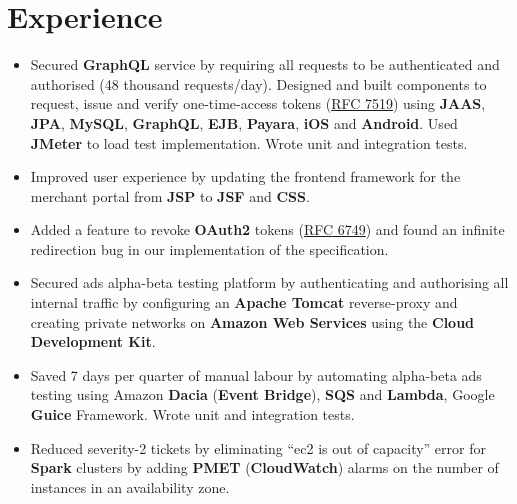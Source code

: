 \section{Experience}

\begin{itemize}[leftmargin=*]
    \item {
        Secured \textbf{GraphQL} service by requiring all requests to be authenticated and authorised (48 thousand requests/day). Designed and built components to request, issue and verify one-time-access tokens (\href{https://datatracker.ietf.org/doc/html/rfc7519}{RFC 7519}) using \textbf{JAAS}, \textbf{JPA}, \textbf{MySQL}, \textbf{GraphQL}, \textbf{EJB}, \textbf{Payara}, \textbf{iOS} and \textbf{Android}. Used \textbf{JMeter} to load test implementation. Wrote unit and integration tests.
    }
    \item {
        Improved user experience by updating the frontend framework for the merchant portal from \textbf{JSP} to \textbf{JSF} and \textbf{CSS}.
    }
    \item {
        Added a feature to revoke \textbf{OAuth2} tokens (\href{https://datatracker.ietf.org/doc/html/rfc6749}{RFC 6749}) and found an infinite redirection bug in our implementation of the specification.
    }
\end{itemize}


\begin{itemize}[leftmargin=*]
    \item {
        Secured ads alpha-beta testing platform by authenticating and authorising all internal traffic by configuring an \textbf{Apache Tomcat} reverse-proxy and creating private networks on \textbf{Amazon Web Services} using the \textbf{Cloud Development Kit}.
    }
    \item {
        Saved 7 days per quarter of manual labour by automating alpha-beta ads testing using Amazon \textbf{Dacia} (\textbf{Event Bridge}), \textbf{SQS} and \textbf{Lambda}, Google \textbf{Guice} Framework. Wrote unit and integration tests.
    }
    \item {
        Reduced severity-2 tickets by eliminating “ec2 is out of capacity” error for \textbf{Spark} clusters by adding \textbf{PMET} (\textbf{CloudWatch}) alarms on the number of instances in an availability zone.
    }
\end{itemize}

